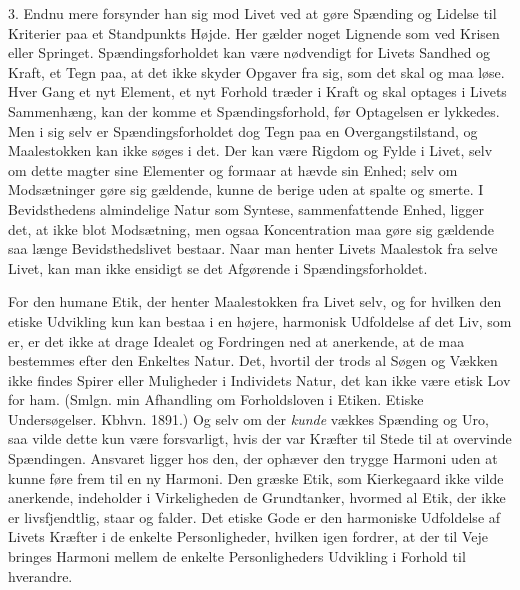 \documentclass[12pt,a4paper,openany]{book}
\newcommand{\opage}[1]{\marginnote{\footnotesize\textit{[#1]}}}
\begin{document}
3. Endnu mere forsynder han sig mod Livet ved at
gøre Spænding og Lidelse til Kriterier paa et Standpunkts
Højde. Her gælder noget Lignende som ved Krisen eller
Springet. Spændingsforholdet kan være nødvendigt for
Livets Sandhed og Kraft, et Tegn paa, at det ikke skyder
Opgaver fra sig, som det skal og maa løse. Hver Gang
et nyt Element, et nyt Forhold træder i Kraft og skal
optages i Livets Sammenhæng, kan der komme et Spændingsforhold,
før Optagelsen er lykkedes. Men i sig selv
er Spændingsforholdet dog Tegn paa en Overgangstilstand,
og Maalestokken kan ikke søges i det. Der kan
være Rigdom og Fylde i Livet, selv om dette magter
sine Elementer og formaar at hævde sin Enhed; selv om
\opage{123}Modsætninger gøre sig gældende, kunne de berige uden
at spalte og smerte. I Bevidsthedens almindelige Natur
som Syntese, sammenfattende Enhed, ligger det, at ikke
blot Modsætning, men ogsaa Koncentration maa gøre sig
gældende saa længe Bevidsthedslivet bestaar. Naar man
henter Livets Maalestok fra selve Livet, kan man ikke
ensidigt se det Afgørende i Spændingsforholdet.

For den humane Etik, der henter Maalestokken fra
Livet selv, og for hvilken den etiske Udvikling kun kan
bestaa i en højere, harmonisk Udfoldelse af det Liv, som
er, er det ikke at drage Idealet og Fordringen ned at
anerkende, at de maa bestemmes efter den Enkeltes Natur.
Det, hvortil der trods al Søgen og Vækken ikke findes
Spirer eller Muligheder i Individets Natur, det kan ikke
være etisk Lov for ham. (Smlgn. min Afhandling om
Forholdsloven i Etiken. Etiske Undersøgelser. Kbhvn.
1891.) Og selv om der \textit{kunde} vækkes Spænding og Uro,
saa vilde dette kun være forsvarligt, hvis der var Kræfter
til Stede til at overvinde Spændingen. Ansvaret ligger
hos den, der ophæver den trygge Harmoni uden at kunne
føre frem til en ny Harmoni. Den græske Etik, som
Kierkegaard ikke vilde anerkende, indeholder i Virkeligheden
de Grundtanker, hvormed al Etik, der ikke er
livsfjendtlig, staar og falder. Det etiske Gode er den
harmoniske Udfoldelse af Livets Kræfter i de enkelte
Personligheder, hvilken igen fordrer, at der til Veje
bringes Harmoni mellem de enkelte Personligheders Udvikling
i Forhold til hverandre.
\end{document}

